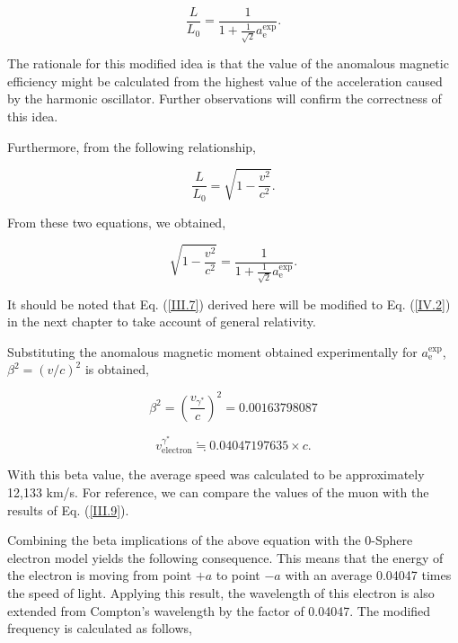 \documentclass[%
 reprint,
 amsmath,amssymb,
 aps,
]{revtex4-1}
\numberwithin{equation}{section}%
\begin{document}
    \begin{equation}
        \frac{L}{L_0} = \frac{1}{1 + \frac{1}{\sqrt{2}}a^{\text{exp}}_{\text{e}}} .
        \label{III.5}
    \end{equation}


The rationale for this modified idea is that the value of the anomalous magnetic efficiency might be calculated from the highest value of the acceleration caused by the harmonic oscillator. Further observations will confirm the correctness of this idea.

Furthermore, from the following relationship,

    \begin{equation}
        \frac{L}{L_0} = \sqrt{1 - \frac{v^2}{c^2}} .
    \end{equation}

From these two equations, we obtained,

    \begin{equation}
        \sqrt{1 - \frac{v^2}{c^2}} = \frac{1}{1 + \frac{1}{\sqrt{2}} a^{\text{exp}}_{\text{e}}}  .
        \label{III.7}
    \end{equation}


It should be noted that Eq. (\ref{III.7}) derived here will be modified to Eq. (\ref{IV.2}) in the next chapter to take account of general relativity.


Substituting the anomalous magnetic moment obtained experimentally for $a^{\text{exp}}_{\text{e}}$, $\beta^2 = (v/{c})^2$ is obtained,


    \begin{equation}
        \beta^2 = (\frac{v_{\gamma^{*}}}{c})^2 = 0.00163798087
    \end{equation}

    \begin{equation}
        v_{\text{electron}}^{\gamma^{*}} \fallingdotseq 0.04047197635 \times c .
        \label{III.9}
    \end{equation}


With this beta value, the average speed was calculated to be approximately 12,133 km/s. For reference, we can compare the values of the muon with the results of Eq. (\ref{III.9}). 

Combining the beta implications of the above equation with the 0-Sphere electron model yields the following consequence. This means that the energy of the electron is moving from point $+a$ to point $-a$ with an average 0.04047 times the speed of light. Applying this result, the wavelength of this electron is also extended from Compton's wavelength by the factor of 0.04047. The modified frequency is calculated as follows,
\end{document}
